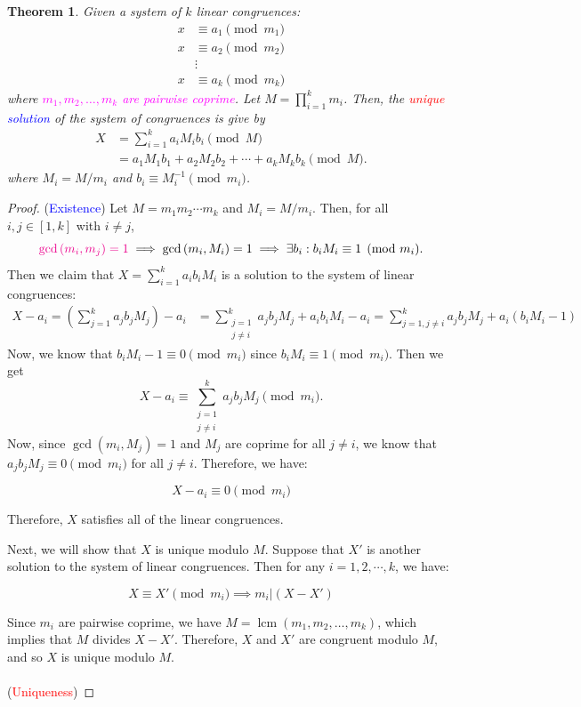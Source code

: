 \documentclass{article}
\newcommand{\inv}[1]{#1^{-1}}
\newtheorem*{theorem*}{Theorem}
\theoremstyle{definition}
\newcommand{\of}[1]{\left( #1 \right)}
\begin{document}
\begin{tcolorbox}[colback=white,colframe=thmcolor,arc=5pt,title={\color{white}\bf Chinese Remainder Theorem ($\mathsf{CRT}$)}]
	\begin{theorem*}
		Given a system of $k$ linear congruences:
		\begin{align*}
			x&\equiv a_1 \pmod{m_1}\\
			x&\equiv a_2 \pmod{m_2}\\
			&\vdots \\
			x&\equiv a_k \pmod{m_k}
		\end{align*} where \textcolor{magenta}{$m_1,m_2,\dots, m_k$ are pairwise coprime}. Let $M=\prod_{i=1}^km_i$. Then, the \textcolor{red}{unique} \textcolor{blue}{solution} of the system of congruences is give by \begin{align*}
			X&=\sum_{i=1}^ka_iM_ib_i\pmod{M}\\
			&=a_1M_1b_1+a_2M_2b_2+\cdots+a_kM_kb_k\pmod{M}.
		\end{align*} where $M_i=M/m_i$ and $ b_i\equiv\inv{M_i}\pmod{m_i}$.
	\end{theorem*}
\end{tcolorbox}
\begin{proof}
	(\textcolor{blue}{Existence}) Let $M=m_1m_2\cdots m_k$ and $M_i=M/m_i$. Then, for all $i,j\in[1,k]$ with $i\neq j$, \[
	\textcolor{magenta}{\gcd\of{m_i,m_j}=1}\implies\gcd\of{m_i, M_i}=1\implies \exists b_i: b_iM_i\equiv1\pmod{m_i}. 
	\] Then we claim that $X=\sum_{i=1}^k a_i b_i M_i$ is a solution to the system of linear congruences: \begin{align*}
		X-a_i=\of{\sum_{j=1}^k a_j b_j M_j} - a_i&=\sum_{\substack{j=1\\ j\neq i}}^k a_j b_j M_j + a_ib_iM_i-a_i
		=\sum_{j=1,j\neq i}^k a_j b_j M_j + a_i(b_iM_i - 1)
	\end{align*}
	Now, we know that $
	b_iM_i-1\equiv 0\pmod{m_i}$ since $b_iM_i\equiv 1\pmod{m_i}$. Then we get \[
	X-a_i\equiv \sum_{\substack{j=1\\ j\neq i}}^k a_j b_j M_j \pmod{m_i}.
	\]
	Now, since $\gcd\of{m_i, M_j}=1$ and $M_j$ are coprime for all $j \neq i$, we know that $a_j b_j M_j \equiv 0 \pmod{m_i}$ for all $j \neq i$. Therefore, we have:
	
	$$X-a_i \equiv 0 \pmod{m_i}$$
	
	Therefore, $X$ satisfies all of the linear congruences.
	
	Next, we will show that $X$ is unique modulo $M$. Suppose that $X'$ is another solution to the system of linear congruences. Then for any $i=1,2,\cdots, k$, we have:
	
	$$X \equiv X' \pmod{m_i} \implies m_i | (X-X')$$
	
	Since $m_i$ are pairwise coprime, we have $M=\operatorname{lcm}(m_1, m_2, \ldots, m_k)$, which implies that $M$ divides $X-X'$. Therefore, $X$ and $X'$ are congruent modulo $M$, and so $X$ is unique modulo $M$.\\
	\\
	(\textcolor{red}{Uniqueness})
\end{proof}
\end{document}
